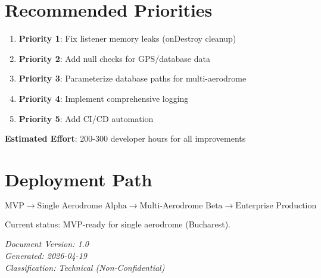 \documentclass[11pt,a4paper]{report}
\begin{document}
\section{Recommended Priorities}

\begin{enumerate}
    \item \textbf{Priority 1}: Fix listener memory leaks (onDestroy cleanup)
    \item \textbf{Priority 2}: Add null checks for GPS/database data
    \item \textbf{Priority 3}: Parameterize database paths for multi-aerodrome
    \item \textbf{Priority 4}: Implement comprehensive logging
    \item \textbf{Priority 5}: Add CI/CD automation
\end{enumerate}

\textbf{Estimated Effort}: 200-300 developer hours for all improvements

\section{Deployment Path}

\[
\text{MVP} \rightarrow \text{Single Aerodrome Alpha} \rightarrow \text{Multi-Aerodrome Beta} \rightarrow \text{Enterprise Production}
\]

Current status: MVP-ready for single aerodrome (Bucharest).

\vspace{2cm}
\noindent \textit{Document Version: 1.0}\\
\textit{Generated: 2026-04-19}\\
\textit{Classification: Technical (Non-Confidential)}
\end{document}
